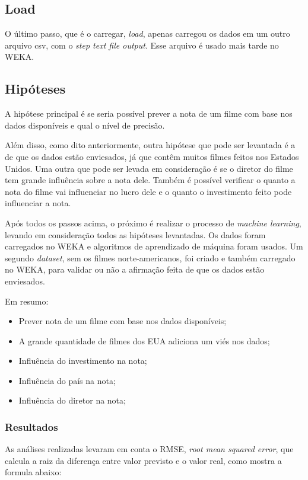 \subsection{Load}
O último passo, que é o carregar, \textit{load}, apenas carregou os dados em um outro arquivo csv, com o \textit{step text file output}. Esse arquivo é usado mais tarde no WEKA.

\subsection{Hipóteses}
A hipótese principal é se seria possível prever a nota de um filme com base nos dados disponíveis e qual o nível de precisão.

Além disso, como dito anteriormente, outra hipótese que pode ser levantada é a de que os dados estão enviesados, já que contêm muitos filmes feitos nos Estados Unidos. Uma outra que pode ser levada em consideração é se o diretor do filme tem grande influência sobre a nota dele. Também é possível verificar o quanto a nota do filme vai influenciar no lucro dele e o quanto o investimento feito pode influenciar a nota.

Após todos os passos acima, o próximo é realizar o processo de \textit{machine learning}, levando em consideração todos as hipóteses levantadas. Os dados foram carregados no WEKA e algoritmos de aprendizado de máquina foram usados. Um segundo \textit{dataset}, sem os filmes norte-americanos, foi criado e também carregado no WEKA, para validar ou não a afirmação feita de que os dados estão enviesados. 

Em resumo:

\begin{itemize}
    \item Prever nota de um filme com base nos dados disponíveis;
    \item A grande quantidade de filmes dos EUA adiciona um viés nos dados;
    \item Influência do investimento na nota;
    \item Influência do país na nota;
    \item Influência do diretor na nota;
\end{itemize}

\subsubsection{Resultados}
As análises realizadas levaram em conta o RMSE, \textit{root mean squared error}, que calcula a raiz da diferença entre valor previsto e o valor real, como mostra a formula abaixo:

